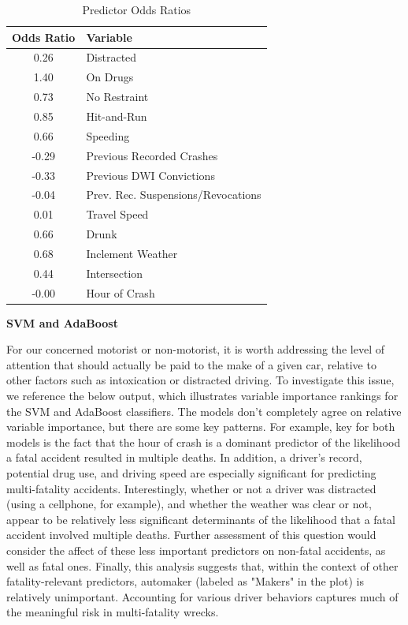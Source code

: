 \documentclass[11pt, oneside,titlepage]{article}   	%
\begin{document}
\begin{table}[H]
\centering
\begin{tabular}{cl}
  \hline
 Odds Ratio & Variable \\ 
  \hline
  0.26 & Distracted \\ 
  1.40 & On Drugs \\ 
  0.73 & No Restraint \\ 
  0.85 & Hit-and-Run \\ 
  0.66 & Speeding \\ 
  -0.29 & Previous Recorded Crashes \\ 
  -0.33 & Previous DWI Convictions \\ 
  -0.04 & Prev. Rec. Suspensions/Revocations \\ 
   0.01 & Travel Speed \\ 
   0.66 & Drunk \\ 
   0.68 & Inclement Weather \\ 
   0.44 & Intersection \\ 
   -0.00 & Hour of Crash \\ 
   \hline
\end{tabular}
\caption{Predictor Odds Ratios} 
\end{table}

\textbf{SVM and AdaBoost}

For our concerned motorist or non-motorist, it is worth addressing the level of attention that should actually be paid to the make of a given car, relative to other factors such as intoxication or distracted driving. To investigate this issue, we reference the below output, which illustrates variable importance rankings for the SVM and AdaBoost classifiers. The models don't completely agree on relative variable importance, but there are some key patterns. For example, key for both models is the fact that the hour of crash is a dominant predictor of the likelihood a fatal accident resulted in multiple deaths. In addition, a driver's record, potential drug use, and driving speed are especially significant for predicting multi-fatality accidents. Interestingly, whether or not a driver was distracted (using a cellphone, for example), and whether the weather was clear or not, appear to be relatively less significant determinants of the likelihood that a fatal accident involved multiple deaths. Further assessment of this question would consider the affect of these less important predictors on non-fatal accidents, as well as fatal ones. Finally, this analysis suggests that, within the context of other fatality-relevant predictors, automaker (labeled as "Makers" in the plot) is relatively unimportant. Accounting for various driver behaviors captures much of the meaningful risk in multi-fatality wrecks. \\
\end{document}
